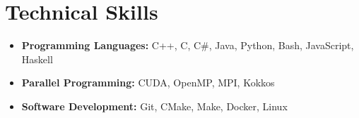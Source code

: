 \section{Technical Skills}

\begin{itemize}[leftmargin=*]
  \item \textbf{Programming Languages:} C++, C, C\#, Java, Python, Bash, JavaScript, Haskell
  \item \textbf{Parallel Programming:} CUDA, OpenMP, MPI, Kokkos
  \item \textbf{Software Development:} Git, CMake, Make, Docker, Linux
\end{itemize}

